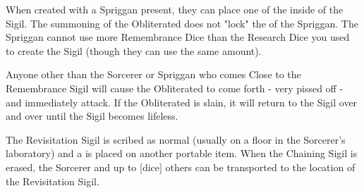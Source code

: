 {

When created with a Spriggan present, they can place one of the  inside of the Sigil.  The summoning of the Obliterated does not "lock" the  of the Spriggan.  The Spriggan cannot use more Remembrance Dice than the Research Dice you used to create the Sigil (though they can use the same amount).  

Anyone other than the Sorcerer or Spriggan who comes Close to the Remembrance Sigil will cause the Obliterated to come forth - very pissed off - and immediately attack.  If the Obliterated is slain, it will return to the Sigil over and over until the Sigil becomes lifeless.





The Revisitation Sigil is scribed as normal (usually on a floor in the Sorcerer's laboratory) and a  is placed on another portable item.  When the Chaining Sigil is erased, the Sorcerer and up to [dice] others can be transported to the location of the Revisitation Sigil.  







} %